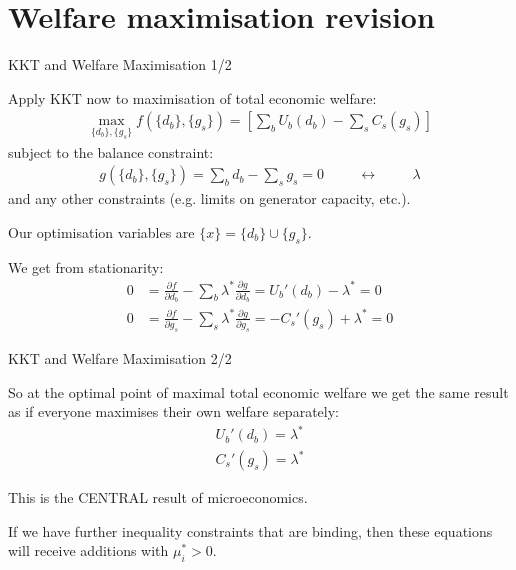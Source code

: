 \documentclass[10pt,aspectratio=169,dvipsnames]{beamer}
\def\l{\lambda}
\def\m{\mu}
\def\d{\partial}
\begin{document}
\section{Welfare maximisation revision}


\begin{frame}{KKT and Welfare Maximisation 1/2}

  Apply KKT now to maximisation of total economic welfare:
  \begin{align*}
    \max_{\{d_b\}, \{g_s\}} f(\{d_b\}, \{g_s\}) = \left[ \sum_b U_b (d_b)  -  \sum_s C_s (g_s) \right]
  \end{align*}
  subject to the balance constraint:
  \begin{align*}
    g(\{d_b\}, \{g_s\}) = \sum_b d_b -  \sum_s g_s  = 0 \hspace{1cm} \leftrightarrow \hspace{1cm} \l
  \end{align*}
  and any other constraints (e.g. limits on generator capacity, etc.).

  Our optimisation variables are $\{x\} = \{d_b\} \cup \{g_s\}$.

  We get from stationarity:
  \begin{align*}
    0 & =   \frac{\d f}{\d d_b} - \sum_b \l^* \frac{\d g}{\d d_b} = U_b'(d_b) - \l^* = 0 \\
    0 & =   \frac{\d f}{\d g_s} - \sum_s \l^* \frac{\d g}{\d g_s} = -C_s'(g_s) + \l^* = 0
  \end{align*}


\end{frame}





\begin{frame}{KKT and Welfare Maximisation 2/2}

  So at the optimal point of maximal total economic welfare we get the
  same result as if everyone maximises their own welfare separately:
  \begin{align*}
 U_b'(d_b) =  \l^*  \\
 C_s'(g_s) = \l^*
  \end{align*}

  This is the CENTRAL result of microeconomics.

  If we have further inequality constraints that are binding, then
  these equations will receive additions with $\m_i^* > 0$.


\end{frame}
\end{document}
